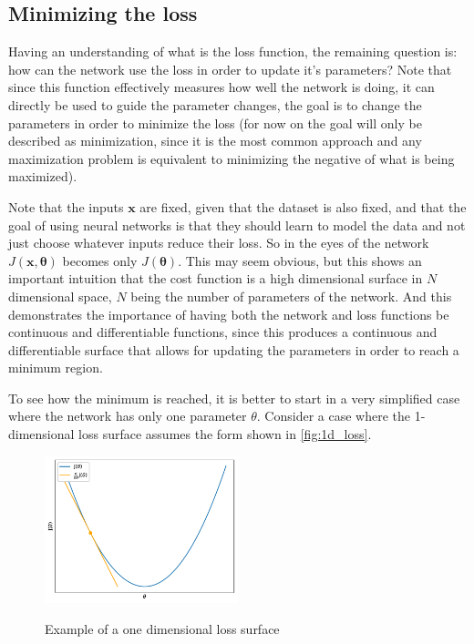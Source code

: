 \subsection{Minimizing the loss} \label{sub:minimizing_loss}
Having an understanding of what is the loss function, the remaining question is: how can the network use the loss in order to update it's parameters? Note that since this function effectively measures how well the network is doing, it can directly be used to guide the parameter changes, the goal is to change the parameters in order to minimize the loss (for now on the goal will only be described as minimization, since it is the most common approach and any maximization problem is equivalent to minimizing the negative of what is being maximized).

Note that the inputs $\bm{x}$ are fixed, given that the dataset is also fixed, and that the goal of using neural networks is that they should learn to model the data and not just choose whatever inputs reduce their loss. So in the eyes of the network $J(\bm{x}, \bm{\theta})$ becomes only $J(\bm{\theta})$. This may seem obvious, but this shows an important intuition that the cost function is a high dimensional surface in $N$ dimensional space, $N$ being the number of parameters of the network. And this demonstrates the importance of having both the network and loss functions be continuous and differentiable functions, since this produces a continuous and differentiable surface that allows for updating the parameters in order to reach a minimum region.

To see how the minimum is reached, it is better to start in a very simplified case where the network has only one parameter $\theta$. Consider a case where the 1-dimensional loss surface assumes the form shown in \autoref{fig:1d_loss}.
\begin{figure}
    \centering
    \caption{Example of a one dimensional loss surface}
    \includegraphics[width=0.5\textwidth]{chapters/NeuralNets/figures/1D-Loss.pdf}
    \label{fig:1d_loss}
\end{figure}

